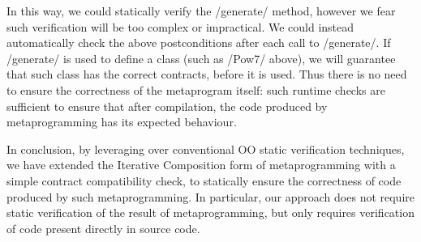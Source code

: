 \vspace{-1ex}
In this way, we could statically verify the /generate/ method, however we fear such verification will be too complex or impractical. 
We could instead automatically check the above postconditions after each call to /generate/. If /generate/ is used to define a class (such as /Pow7/ above), we will guarantee that such class has the correct contracts, before it is used. Thus
there is no need to ensure the correctness of the metaprogram itself: such runtime checks are sufficient to ensure that after compilation, the code produced by metaprogramming has its expected behaviour.

In conclusion, by leveraging over conventional OO static verification techniques, we have extended the Iterative Composition form of metaprogramming with a simple contract compatibility check, to statically ensure the correctness of code produced by such metaprogramming. In particular, our approach does not require static verification of the result of metaprogramming, but only requires verification of code present directly in source code.